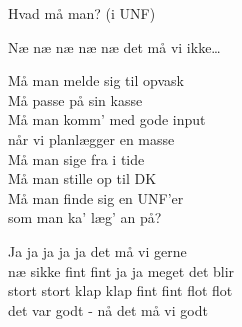 \begin{song}{Hvad må man? (i UNF)}
  \begin{SBChorus}
    Næ næ næ næ næ det må vi ikke\ldots
  \end{SBChorus}

  \begin{SBVerse}
    Må man melde sig til opvask\\
    Må passe på sin kasse\\
    Må man komm’ med gode input\\
    når vi planlægger en masse\\
    Må man sige fra i tide\\
    Må man stille op til DK\\
    Må man finde sig en UNF’er\\
    som man ka’ læg’ an på?
  \end{SBVerse}

  \begin{SBChorus}
    Ja ja ja ja ja det må vi gerne\\
    næ sikke fint fint ja ja meget det blir\\
    stort stort klap klap fint fint flot flot\\
    det var godt - nå det må vi godt
  \end{SBChorus}
\end{song}